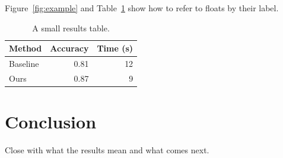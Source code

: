 \documentclass[11pt]{article}
\begin{document}
Figure~\ref{fig:example} and Table~\ref{tab:example} show how to refer to
floats by their label.

\begin{table}[t]
  \centering
  \begin{tabular}{lrr}
    \hline
    Method & Accuracy & Time (s) \\
    \hline
    Baseline & 0.81 & 12 \\
    Ours     & 0.87 & 9 \\
    \hline
  \end{tabular}
  \caption{A small results table.}\label{tab:example}
\end{table}

\section{Conclusion}

Close with what the results mean and what comes next.



\end{document}
